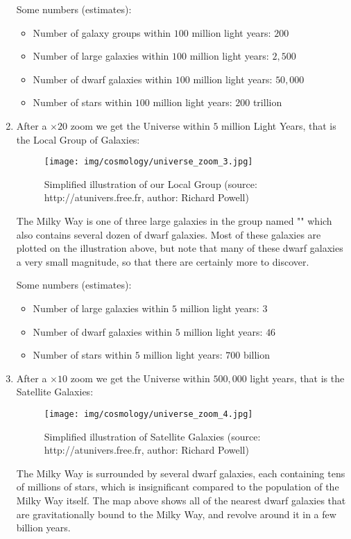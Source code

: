 \begin{enumerate}
		Some numbers (estimates):
		\begin{itemize}
			\item Number of galaxy groups within $100$ million light years: $200$
			\item Number of large galaxies within $100$ million light years: $2,500$
			\item Number of dwarf galaxies within $100$ million light years: $50,000$
			\item Number of stars within $100$ million light years: $200$ trillion
		\end{itemize}
		
		\item After a $\times 20$ zoom we get the Universe within $5$ million Light Years, that is the Local Group of Galaxies:
		\begin{figure}[H]
			\centering
			\texttt{[image: img/cosmology/universe\_zoom\_3.jpg]}
			\caption[Simplified illustration of our Local Group]{Simplified illustration of our Local Group (source: http://atunivers.free.fr, author: Richard Powell)}
		\end{figure}
		The Milky Way is one of three large galaxies in the group named "" which also contains several dozen of dwarf galaxies. Most of these galaxies are plotted on the illustration above, but note that many of these dwarf galaxies a very small magnitude, so that there are certainly more to discover.	
		
		Some numbers (estimates):
		\begin{itemize}
			\item Number of large galaxies within $5$ million light years: $3$
			\item Number of dwarf galaxies within $5$ million light years: $46$
			\item Number of stars within $5$ million light years: $700$ billion
		\end{itemize}
		
		\item After a $\times 10$ zoom we get the Universe within $500,000$ light years, that is the Satellite Galaxies:
		\begin{figure}[H]
			\centering
			\texttt{[image: img/cosmology/universe\_zoom\_4.jpg]}
			\caption[Simplified illustration of Satellite Galaxies]{Simplified illustration of Satellite Galaxies (source: http://atunivers.free.fr, author: Richard Powell)}
		\end{figure}
		The Milky Way is surrounded by several dwarf galaxies, each containing tens of millions of stars, which is insignificant compared to the population of the Milky Way itself. The map above shows all of the nearest dwarf galaxies that are gravitationally bound to the Milky Way, and revolve around it in a few billion years.
		

\end{enumerate}
